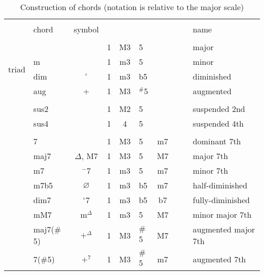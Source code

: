\usepackage{arydshln}


\begin{table*}[!h]
	\centering
	\caption{Construction of chords (notation is relative to the major scale)}
	\begin{tabular}{clccclcccl}
		\hline \vspace{-0.2cm} \\
		 & chord & symbol & & & & & & & name \\
		\hline \vspace{-0.2cm} \\
		\multirow{4}{*}{triad} &         & & 1 & M3 & 5           & & & & major\\
		                       & m       & & 1 & m3 & 5           & & & & minor\\
		                       & dim     & $^\circ$ & 1 & m3 & b5     & & & & diminished\\
		                       & aug     & + & 1 & M3 & $^\#$5 & & & & augmented \\
		\hline  \vspace{-0.2cm} \\
		\multirow{4}{*}{ }    & sus2     & & 1 & M2  & 5   &   &   & & suspended 2nd \\
		                       & sus4    & & 1 & 4   & 5   &   &   & & suspended 4th \\
		\hline \vspace{-0.2cm} \\
		\multirow{8}{*}{tetrad}& 7       &                   & 1 & M3  & 5 & m7                & & & dominant 7th \\
		                       & maj7   & $\Delta$, M$7$  & 1 & M3  & 5 & M7  & & & major 7th\\
		                       & m7     & $^{-}$7            & 1 & m3  & 5 & m7  & & & minor 7th\\
		                       & m7b5   & $\varnothing$      & 1 & m3  & b5 & m7 & & & half-diminished \\
		                       & dim7   & $^{\circ}$7        & 1 & m3  & b5 & b7  & & & fully-diminished\\
        					   & mM7    & m$^\Delta$              & 1 & m3  & 5 & M7   & & & minor major 7th \\
							   & maj7($\#$5) & $+^{\Delta}$    & 1 & M3  & $\#$5 & M7  & & & augmented major 7th \\
		                       & 7($\#$5)    & $+^{7}$       & 1 & M3  & $\#$5 & m7  & & & augmented 7th \\

\end{tabular}
\end{table*}
